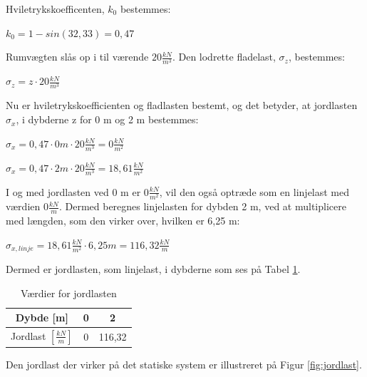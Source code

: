 Hviletrykskoefficenten, $k_0$ bestemmes:
\begin{center}
	$k_0 = 1 - sin(32,\!33) = 0,\!47$
\end{center}

Rumvægten slås op i \citep[ s. 386]{Stabi} til værende $20 \frac{kN}{m^3}$. 
\newline \indent{     }  Den lodrette fladelast, $\sigma_z$, bestemmes:
\begin{center}
	$\sigma_z = z\cdot 20 \frac{kN}{m^3}$
\end{center}

Nu er hviletrykskoefficienten og fladlasten bestemt, og det betyder, at jordlasten $\sigma_x$, i dybderne z for 0 m og 2 m bestemmes:
\begin{center}
	$\sigma_x = 0,\!47\cdot 0 m\cdot 20 \frac{kN}{m^3} = 0 \frac{kN}{m^2}$
\end{center}

\begin{center}
	$\sigma_x = 0,\!47\cdot 2 m\cdot 20 \frac{kN}{m^3} = 18,\!61 \frac{kN}{m^2}$
\end{center}

I og med jordlasten ved 0 m er $0 \frac{kN}{m^2}$, vil den også optræde som en linjelast med værdien $0 \frac{kN}{m}$. Dermed beregnes linjelasten for dybden 2 m, ved at multiplicere med længden, som den virker over, hvilken er 6,25 m:
\begin{center}
	$\sigma_{x,linje} = 18,\!61 \frac{kN}{m^2}\cdot 6,\!25 m = 116,\!32 \frac{kN}{m}$
\end{center}

Dermed er jordlasten, som linjelast, i dybderne som ses på Tabel \ref{tab:jord}.
\begin{table}[htb]
	\begin{center}
		\begin{tabular}{ |c|c|c| } 
		\hline
		Dybde [m] & 0 & 2 \\ \hline
		Jordlast $[\frac{kN}{m}]$ & 0 & 116,32 \\ \hline
		\end{tabular}
		\caption{Værdier for jordlasten}
		\label{tab:jord}
	\end{center}
\end{table}

Den jordlast der virker på det statiske system er illustreret på Figur \ref{fig:jordlast}.

